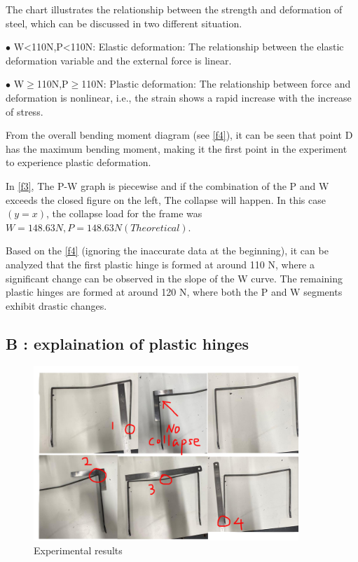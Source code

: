 The chart illustrates the relationship between the strength and deformation of steel, which can be discussed in two different situation.

$\bullet$ W<110N,P<110N: Elastic deformation: The relationship between the elastic deformation variable and the external force is linear.

$\bullet$ W$\geq$110N,P$\geq$110N: Plastic deformation: The relationship between force and deformation is nonlinear, i.e., the strain shows a rapid increase with the increase of stress.

From the overall bending moment diagram (see \autoref{f4}), it can be seen that point D has the maximum bending moment, making it the first point in the experiment to experience plastic deformation.

In \autoref{f3}, The P-W graph is piecewise and if the combination of the P and W exceeds the closed figure on the left, The collapse will happen. In this case$(y=x)$, the collapse load for the frame was $W=148.63N,P=148.63N(Theoretical)$.

Based on the \autoref{f4} (ignoring the inaccurate data at the beginning), it can be analyzed that the first plastic hinge is formed at around 110 N, where a significant change can be observed in the slope of the W curve. The remaining plastic hinges are formed at around 120 N, where both the P and W segments exhibit drastic changes.



\subsection*{B : explaination of plastic hinges}

\begin{figure}[htbp]
    \centering
    \includegraphics[width=10cm]{./fig/18.jpg}
    \caption{Experimental results}
    \label{f5}
\end{figure}

